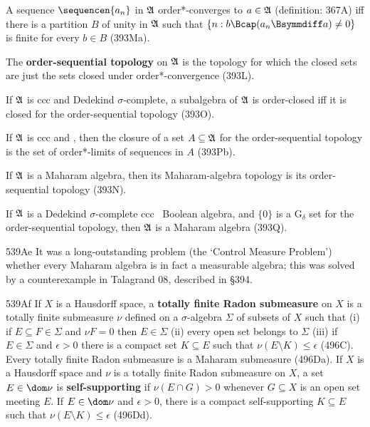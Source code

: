 {\medskip

 A sequence $\sequencen{a_n}$ in $\frak A$
order*-converges to $a\in\frak A$ (definition:  367A)
iff there is a partition $B$ of unity in
$\frak A$ such that $\{n:b\Bcap(a_n\Bsymmdiff a)\ne 0\}$ is finite for
every $b\in B$ (393Ma).

\medskip

 The {\bf order-sequential topology} on $\frak A$
is the topology for which the closed sets are just the sets closed under
order*-convergence (393L).

\medskip

If $\frak A$ is ccc and Dedekind $\sigma$-complete, a subalgebra of
$\frak A$
is order-closed iff it is closed for the order-sequential topology (393O).

\medskip

 If $\frak A$ is ccc and \wsid, then the closure of a
set $A\subseteq\frak A$ for the order-sequential topology is the set of
order*-limits of sequences in $A$ (393Pb).

\medskip

If $\frak A$ is a Maharam algebra, then its Maharam-algebra topology
is its order-sequential topology (393N).

\medskip

If $\frak A$ is a Dedekind $\sigma$-complete ccc \wsid\ Boolean algebra,
and $\{0\}$
is a G$_{\delta}$ set for the order-sequential topology, then $\frak A$ is
a Maharam algebra (393Q).

\spheader 539Ae
It was a long-outstanding problem (the `Control Measure Problem') whether
every Maharam algebra is in fact a measurable algebra;  this was solved by
a counterexample in {\smc Talagrand 08}, described in \S394.

\spheader 539Af
If $X$ is a Hausdorff space, a {\bf totally finite Radon submeasure} on
$X$ is a
totally finite submeasure $\nu$ defined on a $\sigma$-algebra $\Sigma$ of
subsets of $X$ such that (i) if $E\subseteq F\in\Sigma$ and $\nu F=0$ then
$E\in\Sigma$ (ii) every open set belongs to $\Sigma$ (iii) if $E\in\Sigma$
and $\epsilon>0$ there is a compact set $K\subseteq E$ such that
$\nu(E\setminus K)\le\epsilon$ (496C).
Every totally finite Radon submeasure is a Maharam submeasure (496Da).
If $X$ is a Hausdorff space and $\nu$
is a totally finite Radon submeasure on $X$,
a set $E\in\dom\nu$ is {\bf self-supporting} if $\nu(E\cap G)>0$ whenever
$G\subseteq X$ is an open set meeting $E$.   If
$E\in\dom\nu$ and $\epsilon>0$, there is a compact self-supporting
$K\subseteq E$ such that $\nu(E\setminus K)\le\epsilon$ (496Dd).

}
